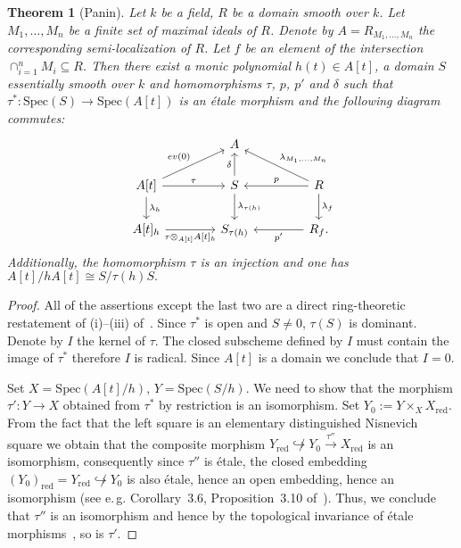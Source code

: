 \documentclass[oneside, 11pt]{amsart} \pdfoutput=1
\numberwithin{equation}{section}
\newtheorem{theorem}[lemma]{Theorem}
\theoremstyle{definition}
\begin{document}
\begin{theorem}[Panin]\label{thm:Panin}
\label{paninthm}
	Let $k$ be a field, $R$ be a domain smooth over $k$. Let $M_1,\ldots, M_n$ be a finite set of maximal ideals of $R$. Denote by $A=R_{M_1,\ldots,M_n}$ the corresponding semi-localization of $R$. Let $f$ be an element of the intersection  $\cap_{i=1}^nM_i \subseteq R$. Then there exist a monic polynomial $h(t)\in A[t]$, a domain $S$ essentially smooth over $k$ and homomorphisms $\tau$, $p$, $p'$ and $\delta$ such that $\tau^*\colon\mathrm{Spec}(S)\to\mathrm{Spec}(A[t])$ is an {\'e}tale morphism and the following diagram commutes:
\begin{equation}\label{eq:panin-diag}
 \begin{tikzcd}[column sep=4em]
   & A & \\ A[t] \ar{d}{\lambda_h} \ar{ru}{ev(0)} \ar{r}{\tau} & S \ar{u}{\delta} \ar{d}{\lambda_{\tau(h)}}  & R \ar{ul}[swap]{\lambda_{M_1,\ldots,M_n}} \ar{d}{\lambda_f} \ar{l}[swap]{p} \\
   A[t]_h \ar{r}[swap]{\tau\otimes_{A[t]}A[t]_h}              & S_{\tau(h)}      & R_f. \ar{l}{p'}\end{tikzcd}
\end{equation}
Additionally, the homomorphism $\tau$ is an injection and one has $A[t]/hA[t]\cong S/\tau(h)S.$ 
\end{theorem}
\begin{proof}
 All of the assertions except the last two are a direct ring-theoretic restatement of (i)--(iii) of~\cite[Theorem~2.5]{Pa19}.
	Since $\tau^*$ is open and $S\neq 0$, $\tau(S)$ is dominant. Denote by $I$ the kernel of $\tau$. The closed subscheme defined by $I$ must contain the image of $\tau^*$ therefore $I$ is radical. Since $A[t]$ is a domain we conclude that $I=0$.		

	Set $X = \mathrm{Spec}(A[t]/h)$, $Y = \mathrm{Spec}(S/h)$. We need to show that the morphism $\tau' \colon Y \to X$ obtained from $\tau^*$ by restriction is an isomorphism. Set $Y_0 := Y \times_{X} X_\mathrm{red}$. From the fact that the left square is an elementary distinguished Nisnevich square we obtain that the composite morphism $Y_\mathrm{red} \not\hookrightarrow Y_0 \xrightarrow{\tau''} X_\mathrm{red}$ is an isomorphism, consequently since $\tau''$ is {\'e}tale, the closed embedding $(Y_0)_\mathrm{red} = Y_\mathrm{red} \not\hookrightarrow Y_0$ is also {\'e}tale, hence an open embedding, hence an isomorphism (see e.\,g. Corollary~3.6, Proposition~3.10 of~\cite{Mi80}). Thus, we conclude that $\tau''$ is an isomorphism and hence by the topological invariance of {\'e}tale morphisms~\cite[Theorem~3.23]{Mi80}, so is $\tau'$.
\end{proof}
\end{document}
